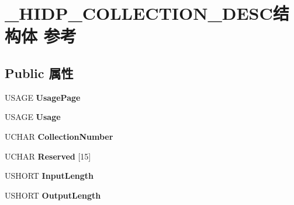 \hypertarget{struct___h_i_d_p___c_o_l_l_e_c_t_i_o_n___d_e_s_c}{}\section{\+\_\+\+H\+I\+D\+P\+\_\+\+C\+O\+L\+L\+E\+C\+T\+I\+O\+N\+\_\+\+D\+E\+S\+C结构体 参考}
\label{struct___h_i_d_p___c_o_l_l_e_c_t_i_o_n___d_e_s_c}
\subsection*{Public 属性}
\begin{DoxyCompactItemize}
\item 
\mbox{\label{struct___h_i_d_p___c_o_l_l_e_c_t_i_o_n___d_e_s_c_a22486bb15a8c84c46c9c15e9e885ff79}} 
U\+S\+A\+GE {\bfseries Usage\+Page}
\item 
\mbox{\label{struct___h_i_d_p___c_o_l_l_e_c_t_i_o_n___d_e_s_c_afe8ad1f7908d3308a6b9e93ed1da84dd}} 
U\+S\+A\+GE {\bfseries Usage}
\item 
\mbox{\label{struct___h_i_d_p___c_o_l_l_e_c_t_i_o_n___d_e_s_c_a082eb12b2655295578aec028bfd5644c}} 
U\+C\+H\+AR {\bfseries Collection\+Number}
\item 
\mbox{\label{struct___h_i_d_p___c_o_l_l_e_c_t_i_o_n___d_e_s_c_a0c8d6f87ec86e6e6bbd795730121d7ee}} 
U\+C\+H\+AR {\bfseries Reserved} \mbox{[}15\mbox{]}
\item 
\mbox{\label{struct___h_i_d_p___c_o_l_l_e_c_t_i_o_n___d_e_s_c_a8b625c0db75e6eb2fafe95981d8ff271}} 
U\+S\+H\+O\+RT {\bfseries Input\+Length}
\item 
\mbox{\label{struct___h_i_d_p___c_o_l_l_e_c_t_i_o_n___d_e_s_c_a50ac00f2452611a61c01375719dc2543}} 
U\+S\+H\+O\+RT {\bfseries Output\+Length}
\item 
\mbox{\label{struct___h_i_d_p___c_o_l_l_e_c_t_i_o_n___d_e_s_c_ac79d9c6bf499d96c3d7aa84b3064bf0a}} 

\end{DoxyCompactItemize}
